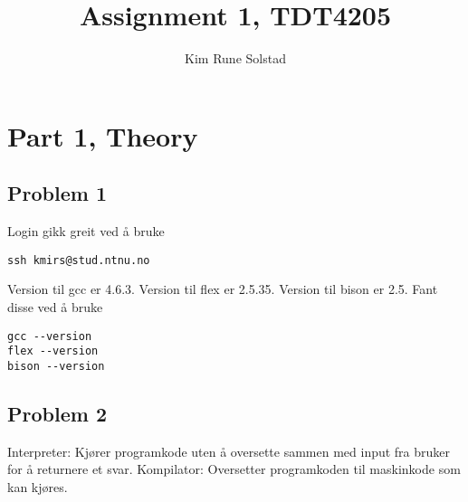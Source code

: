 \documentclass[a4paper, utf8]{article}
\author{Kim Rune Solstad}
\title{Assignment 1, TDT4205}
\begin{document}
\maketitle
\section*{Part 1, Theory}
\subsection*{Problem 1}
Login gikk greit ved å bruke

\begin{lstlisting}
ssh kmirs@stud.ntnu.no
\end{lstlisting}

Version til gcc er 4.6.3. Version til flex er 2.5.35. Version til bison er 2.5. Fant disse ved å bruke 
\begin{lstlisting}
gcc --version
flex --version
bison --version
\end{lstlisting}

\subsection*{Problem 2}
Interpreter: Kjører programkode uten å oversette sammen med input fra bruker for å returnere et svar.
Kompilator: Oversetter programkoden til maskinkode som kan kjøres. 
\end{document}
